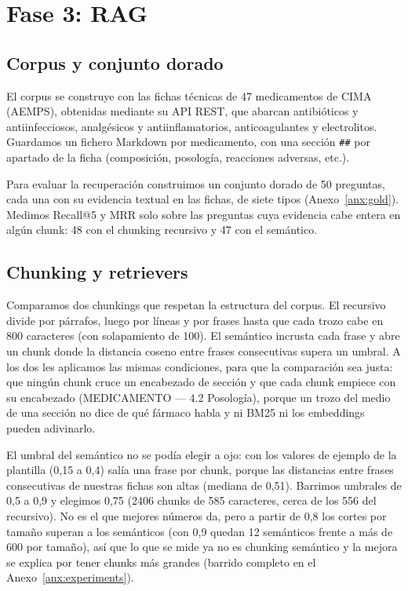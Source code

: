 \section{Fase 3: RAG}
\label{sec:fase3}
\subsection{Corpus y conjunto dorado}
El corpus se construye con las fichas técnicas de 47 medicamentos de CIMA (AEMPS), obtenidas mediante su API REST, que abarcan antibióticos y antiinfecciosos, analgésicos y antiinflamatorios, anticoagulantes y electrolitos. Guardamos un fichero Markdown por medicamento, con una sección \texttt{\#\#} por apartado de la ficha (composición, posología, reacciones adversas, etc.).

Para evaluar la recuperación construimos un conjunto dorado de 50 preguntas, cada una con su evidencia textual en las fichas, de siete tipos (Anexo~\ref{anx:gold}). Medimos Recall@5 y MRR solo sobre las preguntas cuya evidencia cabe entera en algún chunk: 48 con el chunking recursivo y 47 con el semántico.

\subsection{Chunking y retrievers}
Comparamos dos chunkings que respetan la estructura del corpus. El recursivo divide por párrafos, luego por líneas y por frases hasta que cada trozo cabe en 800 caracteres (con solapamiento de 100). El semántico incrusta cada frase y abre un chunk donde la distancia coseno entre frases consecutivas supera un umbral. A los dos les aplicamos las mismas condiciones, para que la comparación sea justa: que ningún chunk cruce un encabezado de sección y que cada chunk empiece con su encabezado (MEDICAMENTO — 4.2 Posología), porque un trozo del medio de una sección no dice de qué fármaco habla y ni BM25 ni los embeddings pueden adivinarlo.

El umbral del semántico no se podía elegir a ojo: con los valores de ejemplo de la plantilla (0,15 a 0,4) salía una frase por chunk, porque las distancias entre frases consecutivas de nuestras fichas son altas (mediana de 0,51). Barrimos umbrales de 0,5 a 0,9 y elegimos 0,75 (2406 chunks de 585 caracteres, cerca de los 556 del recursivo). No es el que mejores números da, pero a partir de 0,8 los cortes por tamaño superan a los semánticos (con 0,9 quedan 12 semánticos frente a más de 600 por tamaño), así que lo que se mide ya no es chunking semántico y la mejora se explica por tener chunks más grandes (barrido completo en el Anexo~\ref{anx:experiments}).

